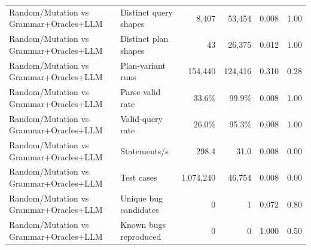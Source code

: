 \begin{table}[t]
\begin{tabular}{llrrrr}
    Random/Mutation vs Grammar+Oracles+LLM & Distinct query shapes & 8{,}407 & 53{,}454 & 0.008 & 1.00 \\
    Random/Mutation vs Grammar+Oracles+LLM & Distinct plan shapes & 43 & 26{,}375 & 0.012 & 1.00 \\
    Random/Mutation vs Grammar+Oracles+LLM & Plan-variant runs & 154{,}440 & 124{,}416 & 0.310 & 0.28 \\
    Random/Mutation vs Grammar+Oracles+LLM & Parse-valid rate & 33.6\% & 99.9\% & 0.008 & 1.00 \\
    Random/Mutation vs Grammar+Oracles+LLM & Valid-query rate & 26.0\% & 95.3\% & 0.008 & 1.00 \\
    Random/Mutation vs Grammar+Oracles+LLM & Statements/s & 298.4 & 31.0 & 0.008 & 0.00 \\
    Random/Mutation vs Grammar+Oracles+LLM & Test cases & 1{,}074{,}240 & 46{,}754 & 0.008 & 0.00 \\
    Random/Mutation vs Grammar+Oracles+LLM & Unique bug candidates & 0 & 1 & 0.072 & 0.80 \\
    Random/Mutation vs Grammar+Oracles+LLM & Known bugs reproduced & 0 & 0 & 1.000 & 0.50 \\
    \bottomrule
  \end{tabular}
\end{table}
